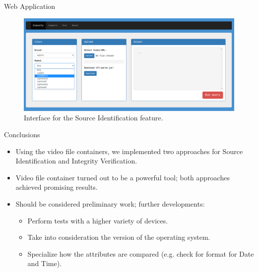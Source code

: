 \begin{tframe}{Web Application}

\begin{figure}
\centering
    \includegraphics[width=1\textwidth]{images/webapp.png}
    \caption{Interface for the Source Identification feature.}
\end{figure}

\end{tframe}

\begin{tframe}{Conclusions}

\begin{itemize}
\item Using the video file containers, we implemented two approaches for Source Identification and Integrity Verification.
\vspace{0.2cm}
\item Video file container turned out to be a powerful tool; both approaches achieved promising results.
\vspace{0.2cm}
\item Should be considered preliminary work; further developments:
\begin{itemize}
\vspace{0.2cm}
\item Perform tests with a higher variety of devices.
\vspace{0.2cm}
\item Take into consideration the version of the operating system.
\vspace{0.2cm}
\item Specialize how the attributes are compared (e.g. check for format for Date and Time).
\end{itemize}
\end{itemize}
\end{tframe}
